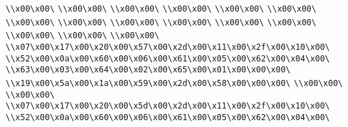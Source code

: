 \verb|\\x00\x00\|\newline
\verb|\\x00\x00\|\newline
\verb|\\x00\x00\|\newline
\verb|\\x00\x00\|\newline
\verb|\\x00\x00\|\newline
\verb|\\x00\x00\|\newline
\verb|\\x00\x00\|\newline
\verb|\\x00\x00\|\newline
\verb|\\x00\x00\|\newline
\verb|\\x00\x00\|\newline
\verb|\\x00\x00\|\newline
\verb|\\x00\x00\|\newline
\verb|\\x00\x00\|\newline
\verb|\\x00\x00\|\newline
\verb|\\x00\x00\|\newline
\verb|\\x07\x00\x17\x00\x20\x00\x57\x00\x2d\x00\x11\x00\x2f\x00\x10\x00\|\newline
\verb|\\x52\x00\x0a\x00\x60\x00\x06\x00\x61\x00\x05\x00\x62\x00\x04\x00\|\newline
\verb|\\x63\x00\x03\x00\x64\x00\x02\x00\x65\x00\x01\x00\x00\x00\|\newline
\verb|\\x19\x00\x5a\x00\x1a\x00\x59\x00\x2d\x00\x58\x00\x00\x00\|\newline
\verb|\\x00\x00\|\newline
\verb|\\x00\x00\|\newline
\verb|\\x07\x00\x17\x00\x20\x00\x5d\x00\x2d\x00\x11\x00\x2f\x00\x10\x00\|\newline
\verb|\\x52\x00\x0a\x00\x60\x00\x06\x00\x61\x00\x05\x00\x62\x00\x04\x00\|\newline
